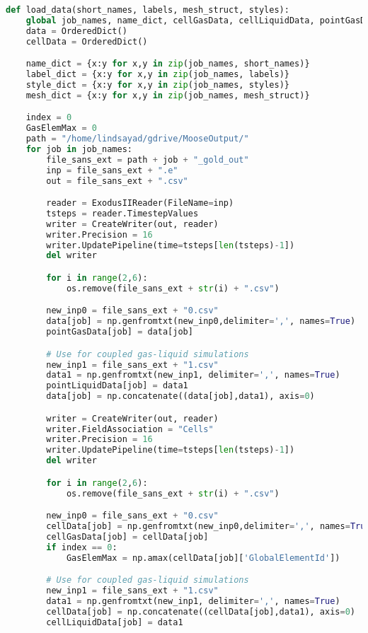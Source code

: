 \begin{lstlisting}[language = Python, caption = Python method for turning raw Exodus file data into numpy arrays using Paraview's \cite{paraview} python interface, label = code:load_data]
def load_data(short_names, labels, mesh_struct, styles):
    global job_names, name_dict, cellGasData, cellLiquidData, pointGasData, pointLiquidData, label_dict, style_dict, mesh_dict
    data = OrderedDict()
    cellData = OrderedDict()

    name_dict = {x:y for x,y in zip(job_names, short_names)}
    label_dict = {x:y for x,y in zip(job_names, labels)}
    style_dict = {x:y for x,y in zip(job_names, styles)}
    mesh_dict = {x:y for x,y in zip(job_names, mesh_struct)}

    index = 0
    GasElemMax = 0
    path = "/home/lindsayad/gdrive/MooseOutput/"
    for job in job_names:
        file_sans_ext = path + job + "_gold_out"
        inp = file_sans_ext + ".e"
        out = file_sans_ext + ".csv"

        reader = ExodusIIReader(FileName=inp)
        tsteps = reader.TimestepValues
        writer = CreateWriter(out, reader)
        writer.Precision = 16
        writer.UpdatePipeline(time=tsteps[len(tsteps)-1])
        del writer

        for i in range(2,6):
            os.remove(file_sans_ext + str(i) + ".csv")

        new_inp0 = file_sans_ext + "0.csv"
        data[job] = np.genfromtxt(new_inp0,delimiter=',', names=True)
        pointGasData[job] = data[job]

        # Use for coupled gas-liquid simulations
        new_inp1 = file_sans_ext + "1.csv"
        data1 = np.genfromtxt(new_inp1, delimiter=',', names=True)
        pointLiquidData[job] = data1
        data[job] = np.concatenate((data[job],data1), axis=0)

        writer = CreateWriter(out, reader)
        writer.FieldAssociation = "Cells"
        writer.Precision = 16
        writer.UpdatePipeline(time=tsteps[len(tsteps)-1])
        del writer

        for i in range(2,6):
            os.remove(file_sans_ext + str(i) + ".csv")

        new_inp0 = file_sans_ext + "0.csv"
        cellData[job] = np.genfromtxt(new_inp0,delimiter=',', names=True)
        cellGasData[job] = cellData[job]
        if index == 0:
            GasElemMax = np.amax(cellData[job]['GlobalElementId'])

        # Use for coupled gas-liquid simulations
        new_inp1 = file_sans_ext + "1.csv"
        data1 = np.genfromtxt(new_inp1, delimiter=',', names=True)
        cellData[job] = np.concatenate((cellData[job],data1), axis=0)
        cellLiquidData[job] = data1
\end{lstlisting}

